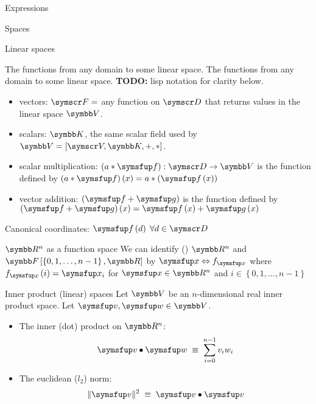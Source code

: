 \documentclass{PalisadesLakesArticle}
\begin{document}
\begin{plSection}{Expressions}
\begin{plSection}{Spaces}
\begin{plSection}{Linear spaces}
\begin{plExample}{The functions from any domain to some linear space.}{}
The functions from any domain to some linear space.
\textbf{TODO:} lisp notation for clarity below.
\begin{itemize}
  \item vectors: $\Set{F} = $ any function on $\Set{D}$
  that returns values in the linear space $\Space{V}$.
  \item scalars: $\Space{K}$, the same scalar field used by
  $\Space{V}=\left[ \Set{V}, \Space{K}, +, * \right]$.
  \item scalar multiplication:
  $ \left(a*\Vector{f}\right) : \Set{D} \rightarrow \Space{V}$
  is the function defined by
   $ \left(a*\Vector{f}\right) (x)
   = a*\left(\Vector{f}\left( x \right) \right) $
  \item vector addition:
  $\left( \Vector{f} + \Vector{g} \right) $
  is the function defined by
  $\left( \Vector{f} + \Vector{g} \right) \left( x \right) =
  \Vector{f} \left( x \right) + \Vector{g} \left( x\right)$
\end{itemize}
Canonical coordinates: 
$\Vector{f}\left( d \right) \; \forall d \in \Set{D}$
\end{plExample}

\begin{plExample}{{ $\Space{R}^n$ as a function space }}{}
We can identify 
() 
$\Space{R}^n$ and 
$ \Space{F} \left[ \left\{ 0, 1, \ldots, {n-1} \right\}, \Space{R} \right] $
by
$\Vector{x} \Leftrightarrow f_{\Vector{x}}$
where $f_{\Vector{x}} \left( i \right) = \Vector{x}_i$
for $\Vector{x} \in \Space{R}^n$ and 
$i \in \left\{ 0, 1, \ldots, {n-1} \right\}$
\end{plExample}

\begin{plSection}{Inner product (linear) spaces}
Let $\Space{V}$ be an $n$-dimensional real inner product space.
Let $\Vector{v}, \Vector{w} \in \Space{V}$.

\begin{itemize}
\item The inner (dot) product on $\Reals^n$:
\begin{equation}
\Vector{v} \bullet \Vector{w} \; \equiv \; \sum_{i=0}^{n-1} v_i w_i
\end{equation}

\item The euclidean ($l_2$) norm:
\begin{equation}
\| \Vector{v} \|^2 \; \equiv \; \Vector{v} \bullet \Vector{v}
\end{equation}


\end{itemize}
\end{plSection}
\end{plSection}
\end{plSection}
\end{plSection}
\end{document}
